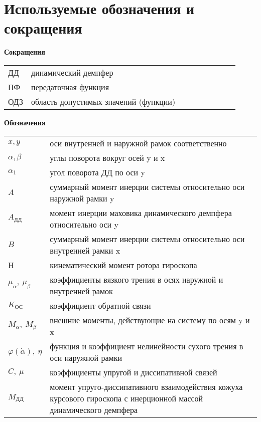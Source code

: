 \documentclass[main.tex]{subfiles}
\begin{document}
\section*{Используемые обозначения и сокращения}
\begin{table}[h]
    \begin{center}
        \textbf{Сокращения}
        \begin{tabular}{p{0.1\linewidth}p{0.9\linewidth}}
            ДД & динамический демпфер \\
            ПФ & передаточная функция \\
            ОДЗ & область допустимых значений (функции) \\
        \end{tabular}
        \textbf{Обозначения}
        \begin{tabular}{p{0.1\linewidth}p{0.9\linewidth}}
            \( x, y \) & оси внутренней и наружной рамок соответственно \\
            \( \alpha, \beta \) & углы поворота вокруг осей y и x \\
            \( \alpha_1 \) & угол поворота ДД  по оси y \\
            \( A \) & суммарный момент инерции системы относительно оси наружной рамки y \\
            \( A_\text{ДД} \) & момент инерции маховика динамического демпфера относительно оси y \\ 
            \( B \) & суммарный момент инерции системы относительно оси внутренней рамки x \\
            H & кинематический момент ротора гироскопа \\
            \( \mu_\alpha,\ \mu_\beta \) & коэффициенты вязкого трения в осях наружной и внутренней рамок \\
            \( K_{\text{ОС}} \) & коэффициент обратной связи \\
            \( M_\alpha,\ M_\beta \) & внешние моменты, действующие на систему по осям y и x \\
            \( \varphi(\dot{\alpha}),\ \eta \) & функция и коэффициент нелинейности сухого трения в оси наружной рамки \\
            \( C,\ \mu \) & коэффициенты упругой и диссипативной связей \\
            \( M_\text{ДД} \) & момент упруго-диссипативного взаимодействия кожуха курсового
            гироскопа с инерционной массой динамического демпфера \\
        \end{tabular}
    \end{center}    
\end{table}
\end{document}
